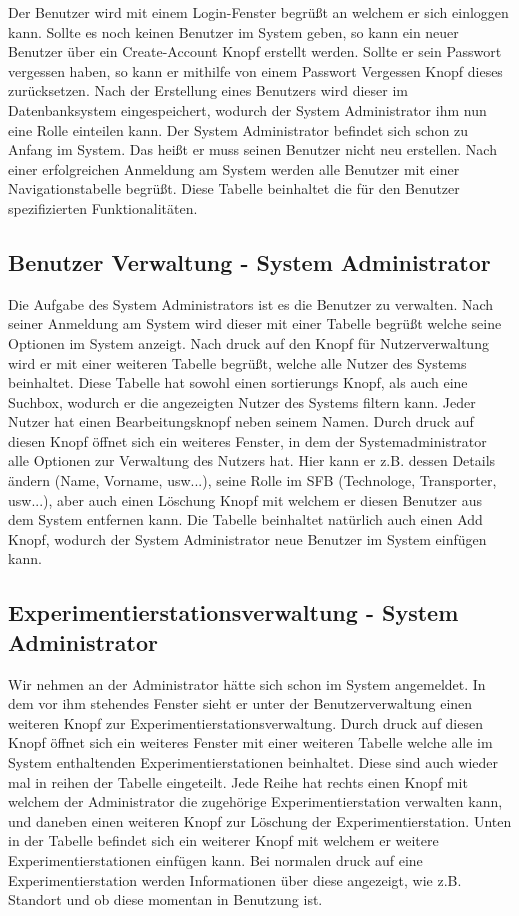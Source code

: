 \documentclass[enabledeprecatedfontcommands,fontsize=12pt,paper=a4,twoside]{scrartcl}
\begin{document}
Der Benutzer wird mit einem Login-Fenster begrüßt an welchem er sich einloggen kann. Sollte es noch keinen Benutzer im System geben, so kann ein neuer Benutzer über ein Create-Account Knopf erstellt werden. Sollte er sein Passwort vergessen haben, so kann er mithilfe von einem Passwort Vergessen Knopf dieses zurücksetzen.
Nach der Erstellung eines Benutzers wird dieser im Datenbanksystem eingespeichert, wodurch der System Administrator ihm nun eine Rolle einteilen kann.
Der System Administrator befindet sich schon zu Anfang im System. Das heißt er muss seinen Benutzer nicht neu erstellen.
Nach einer erfolgreichen Anmeldung am System werden alle Benutzer mit einer Navigationstabelle begrüßt. Diese Tabelle beinhaltet die für den Benutzer spezifizierten Funktionalitäten.

\subsection{Benutzer Verwaltung - System Administrator}

Die Aufgabe des System Administrators ist es die Benutzer zu verwalten. Nach seiner Anmeldung am System wird dieser mit einer Tabelle begrüßt welche seine Optionen im System anzeigt. Nach druck auf den Knopf für Nutzerverwaltung wird er mit einer weiteren Tabelle begrüßt, welche alle Nutzer des Systems beinhaltet. Diese Tabelle hat sowohl einen sortierungs Knopf, als auch eine Suchbox, wodurch er die angezeigten Nutzer des Systems filtern kann.
Jeder Nutzer hat einen Bearbeitungsknopf neben seinem Namen. Durch druck auf diesen Knopf öffnet sich ein weiteres Fenster, in dem der Systemadministrator alle Optionen zur Verwaltung des Nutzers hat. Hier kann er z.B. dessen Details ändern (Name, Vorname, usw...), seine Rolle im SFB (Technologe, Transporter, usw...), aber auch einen Löschung Knopf mit welchem er diesen Benutzer aus dem System entfernen kann. 
Die Tabelle beinhaltet natürlich auch einen Add Knopf, wodurch der System Administrator neue Benutzer im System einfügen kann. 

\subsection{Experimentierstationsverwaltung - System Administrator}

Wir nehmen an der Administrator hätte sich schon im System angemeldet. In dem vor ihm stehendes Fenster sieht er unter der Benutzerverwaltung einen weiteren Knopf zur Experimentierstationsverwaltung. Durch druck auf diesen Knopf öffnet sich ein weiteres Fenster mit einer weiteren Tabelle welche alle im System enthaltenden Experimentierstationen beinhaltet.  Diese sind auch wieder mal in reihen der Tabelle eingeteilt. Jede Reihe hat rechts einen Knopf mit welchem der Administrator die zugehörige Experimentierstation verwalten kann, und daneben einen weiteren Knopf zur Löschung der Experimentierstation.
Unten in der Tabelle befindet sich ein weiterer Knopf mit welchem er weitere Experimentierstationen einfügen kann.
Bei normalen druck auf eine Experimentierstation werden Informationen über diese angezeigt, wie z.B. Standort und ob diese momentan in Benutzung ist. 
  
\end{document}
